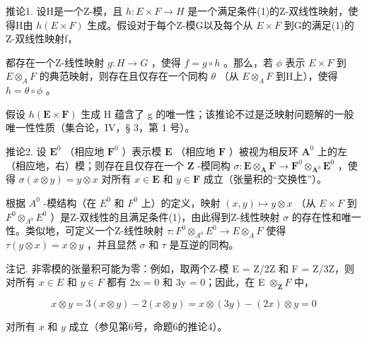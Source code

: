 推论1. 设H是一个Z-模，且 \(h:E \times F \rightarrow H\) 是一个满足条件(1)的Z-双线性映射，使得H由 \(h(E \times F)\) 生成。假设对于每个Z-模G以及每个从 \(E \times F\) 到G的满足(1)的Z-双线性映射f，

都存在一个Z-线性映射 \(g:H \to G\) ，使得 \(f = g \circ h\) 。那么，若 \(\phi\) 表示 \(E \times F\) 到 \(E \otimes_{A} F\) 的典范映射，则存在且仅存在一个同构 \(\theta\) （从 \(E \otimes_{A} F\) 到H上），使得 \(h = \theta \circ \phi\) 。

假设 \(h(\mathbf{E} \times \mathbf{F})\) 生成 H 蕴含了 g 的唯一性；该推论不过是泛映射问题解的一般唯一性性质（集合论，IV，§ 3，第 1 号）。

推论2. 设 \(\mathbf{E}^0\) （相应地 \(\mathbf{F}^0\) ）表示模 \(\mathbf{E}\) （相应地 \(\mathbf{F}\) ）被视为相反环 \(\mathbf{A}^0\) 上的左（相应地，右）模；则存在且仅存在一个 \(\mathbf{Z}\) -模同构 \(\sigma: \mathbf{E} \otimes_{\mathbf{A}} \mathbf{F} \to \mathbf{F}^0 \otimes_{\mathbf{A}^0} \mathbf{E}^0\) ，使得 \(\sigma(x \otimes y) = y \otimes x\) 对所有 \(x \in \mathbf{E}\) 和 \(y \in \mathbf{F}\) 成立（张量积的“交换性”）。

根据 \(A^{0}\) -模结构（在 \(E^{0}\) 和 \(F^{0}\) 上）的定义，映射 \((x,y)\mapsto y\otimes x\) （从 \(E\times F\) 到 \(F^{0}\otimes_{A^{0}}E^{0}\) ）是Z-双线性的且满足条件(1)，由此得到Z-线性映射 \(\sigma\) 的存在性和唯一性。类似地，可定义一个Z-线性映射 \(\tau:F^{0}\otimes_{A^{0}}E^{0}\to E\otimes_{A}F\) 使得 \(\tau(y\otimes x)=x\otimes y\) ，并且显然 \(\sigma\) 和 \(\tau\) 是互逆的同构。

注记. 非零模的张量积可能为零：例如，取两个Z-模 E = Z/2Z 和 F = Z/3Z，则对所有 \(x \in E\) 和 \(y \in F\) 都有 2x = 0 和 3y = 0；因此，在 E \(\otimes_{\mathbf{Z}} F\) 中，

\[
x \otimes y = 3 (x \otimes y) - 2 (x \otimes y) = x \otimes (3 y) - (2 x) \otimes y = 0
\]

对所有 \(x\) 和 \(y\) 成立（参见第6号，命题6的推论4）。

